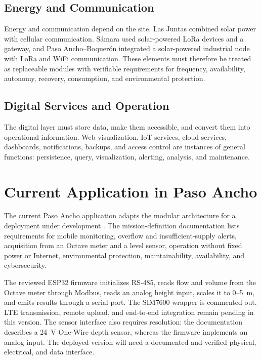 \documentclass[conference]{IEEEtran}
\begin{document}
\subsection{Energy and Communication}

Energy and communication depend on the site. Las Juntas combined solar power with cellular communication. S\'{a}mara used solar-powered LoRa devices and a gateway, and Paso Ancho--Boquer\'{o}n integrated a solar-powered industrial node with LoRa and WiFi communication. These elements must therefore be treated as replaceable modules with verifiable requirements for frequency, availability, autonomy, recovery, consumption, and environmental protection.

\subsection{Digital Services and Operation}

The digital layer must store data, make them accessible, and convert them into operational information. Web visualization, IoT services, cloud services, dashboards, notifications, backups, and access control are instances of general functions: persistence, query, visualization, alerting, analysis, and maintenance.

\section{Current Application in Paso Ancho}

The current Paso Ancho application adapts the modular architecture for a deployment under development \cite{deltalabo2026repo}. The mission-definition documentation lists requirements for mobile monitoring, overflow and insufficient-supply alerts, acquisition from an Octave meter and a level sensor, operation without fixed power or Internet, environmental protection, maintainability, availability, and cybersecurity.

The reviewed ESP32 firmware initializes RS-485, reads flow and volume from the Octave meter through Modbus, reads an analog height input, scales it to 0--5~m, and emits results through a serial port. The SIM7600 wrapper is commented out. LTE transmission, remote upload, and end-to-end integration remain pending in this version. The sensor interface also requires resolution: the documentation describes a 24~V One-Wire depth sensor, whereas the firmware implements an analog input. The deployed version will need a documented and verified physical, electrical, and data interface.
\end{document}
